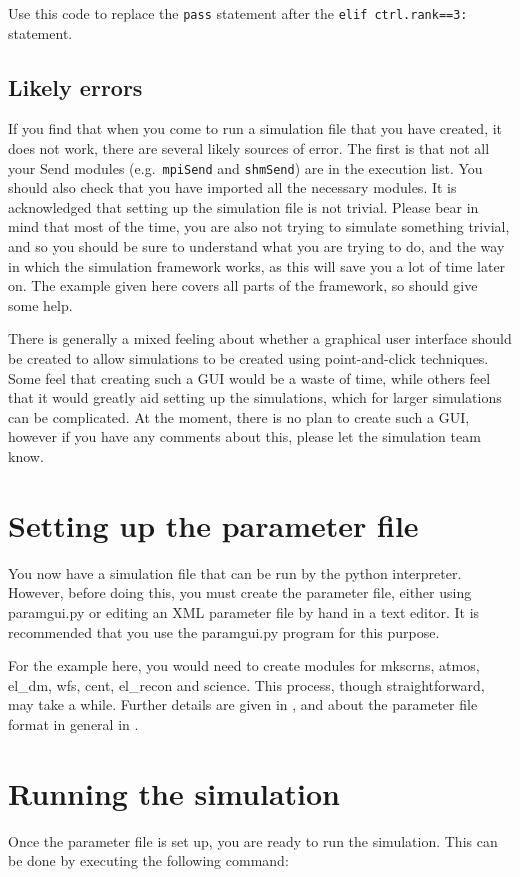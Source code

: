 \documentclass{article}
\newcommand{\mod}[1]{\texttt{#1}}
\begin{document}
Use this code to replace the \texttt{pass} statement after the
\texttt{elif ctrl.rank==3:} statement.

\subsection{Likely errors}
If you find that when you come to run a simulation file that you have
created, it does not work, there are several likely sources of error.
The first is that not all your Send modules (e.g.\ \mod{mpiSend} and
\mod{shmSend}) are in the execution list.  You should also check that
you have imported all the necessary modules.  It is acknowledged that
setting up the simulation file is not trivial.  Please bear in mind
that most of the time, you are also not trying to simulate something
trivial, and so you should be sure to understand what you are trying
to do, and the way in which the simulation framework works, as this
will save you a lot of time later on.  The example given here covers
all parts of the framework, so should give some help.

There is generally a mixed feeling about whether a graphical user
interface should be created to allow simulations to be created using
point-and-click techniques.  Some feel that creating such a GUI would
be a waste of time, while others feel that it would greatly aid
setting up the simulations, which for larger simulations can be
complicated.  At the moment, there is no plan to create such a GUI,
however if you have any comments about this, please let the simulation
team know.

\section{Setting up the parameter file}
\label{sect:paramfile}
You now have a simulation file that can be run by the python
interpreter.  However, before doing this, you must create the
parameter file, either using paramgui.py or editing an XML parameter
file by hand in a text editor.  It is recommended that you use the
paramgui.py program for this purpose. 

For the example here, you would need to create modules for mkscrns,
atmos, el\_dm, wfs, cent, el\_recon and
science.  This process, though straightforward, may take a while.
Further details are given in \citet{simparamgui}, and about the
parameter file format in general in \citet{overview}.



\section{Running the simulation}
Once the parameter file is set up, you are ready to run the
simulation.  This can be done by executing the following command:
\end{document}

